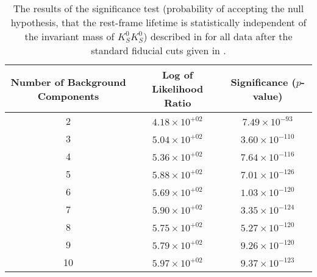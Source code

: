 \begin{table}[h]
    \begin{center}
        \begin{tabular}{ccc}\toprule
            Number of Background Components & Log of Likelihood Ratio & Significance ($p$-value) \\\midrule
             2 & $4.18 \times 10^{+02}$ & $7.49 \times 10^{-93}$ \\
             3 & $5.04 \times 10^{+02}$ & $3.60 \times 10^{-110}$ \\
             4 & $5.36 \times 10^{+02}$ & $7.64 \times 10^{-116}$ \\
             5 & $5.88 \times 10^{+02}$ & $7.01 \times 10^{-126}$ \\
             6 & $5.69 \times 10^{+02}$ & $1.03 \times 10^{-120}$ \\
             7 & $5.90 \times 10^{+02}$ & $3.35 \times 10^{-124}$ \\
             8 & $5.75 \times 10^{+02}$ & $5.27 \times 10^{-120}$ \\
             9 & $5.79 \times 10^{+02}$ & $9.26 \times 10^{-120}$ \\
             10 & $5.97 \times 10^{+02}$ & $9.37 \times 10^{-123}$ \\\bottomrule
        \end{tabular}
        \caption{The results of the significance test (probability of accepting the null hypothesis, that the rest-frame lifetime is statistically independent of the invariant mass of $K_S^0K_S^0$) described in  for all data after the standard fiducial cuts given in .}\label{tab:independence-test}
    \end{center}
\end{table}
